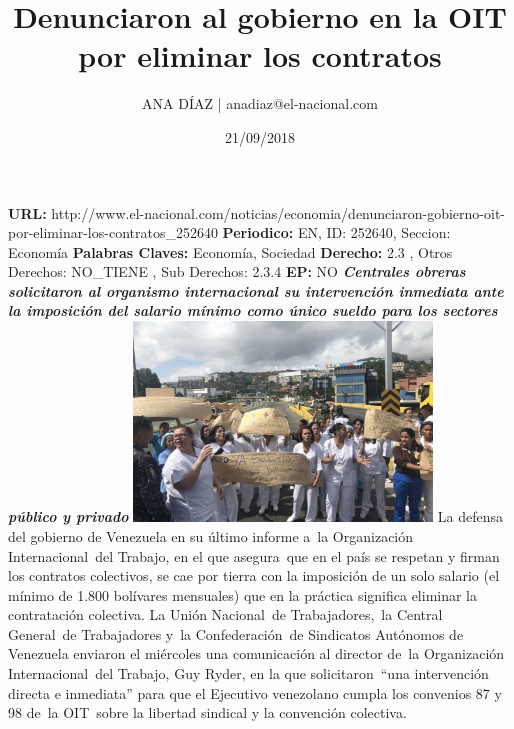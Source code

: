 \documentclass{article}%
\title{\textbf{Denunciaron al gobierno en la OIT por eliminar los contratos}}%
\author{ANA DÍAZ | anadiaz@el{-}nacional.com}%
\date{21/09/2018}%
\begin{document}
%
\normalsize%
\maketitle%
\textbf{URL: }%
http://www.el{-}nacional.com/noticias/economia/denunciaron{-}gobierno{-}oit{-}por{-}eliminar{-}los{-}contratos\_252640\newline%
%
\textbf{Periodico: }%
EN, %
ID: %
252640, %
Seccion: %
Economía\newline%
%
\textbf{Palabras Claves: }%
Economía, Sociedad\newline%
%
\textbf{Derecho: }%
2.3%
, Otros Derechos: %
NO\_TIENE%
, Sub Derechos: %
2.3.4%
\newline%
%
\textbf{EP: }%
NO\newline%
\newline%
%
\textbf{\textit{Centrales obreras solicitaron al organismo internacional su intervención inmediata ante la imposición del salario mínimo como único sueldo para los sectores público y privado}}%
\newline%
\newline%
%
\includegraphics[width=300px]{197.jpg}%
\newline%
%
La defensa del gobierno de Venezuela en su último informe a~la Organización Internacional~del Trabajo, en el que asegura~que en el país se respetan y firman los contratos colectivos, se cae por tierra con la imposición de un solo salario (el mínimo de 1.800 bolívares mensuales) que en la práctica significa eliminar la contratación colectiva.%
\newline%
%
La Unión Nacional~de Trabajadores,~la Central General~de Trabajadores y~la Confederación~de Sindicatos Autónomos de Venezuela enviaron el miércoles una comunicación al director de~la Organización Internacional~del Trabajo, Guy Ryder, en la que solicitaron~“una intervención directa e inmediata” para que el Ejecutivo venezolano cumpla los convenios 87 y 98 de~la OIT~sobre la libertad sindical y la convención colectiva.%
\newline%
\end{document}
